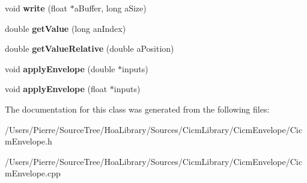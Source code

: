 \begin{DoxyCompactItemize}
\item 
\hypertarget{class_cicm_envelope_ad3eb165d5b296ecd2c532993c97a5d17}{void {\bfseries write} (float $\ast$a\-Buffer, long a\-Size)}\label{class_cicm_envelope_ad3eb165d5b296ecd2c532993c97a5d17}

\item 
\hypertarget{class_cicm_envelope_a35c269e2eba9d65b13dbcab6c62890a8}{double {\bfseries get\-Value} (long an\-Index)}\label{class_cicm_envelope_a35c269e2eba9d65b13dbcab6c62890a8}

\item 
\hypertarget{class_cicm_envelope_a0c9d3139c915d5b324c4d4a24e3931c7}{double {\bfseries get\-Value\-Relative} (double a\-Position)}\label{class_cicm_envelope_a0c9d3139c915d5b324c4d4a24e3931c7}

\item 
\hypertarget{class_cicm_envelope_a786d4ea6d6ecd1e8614a8eb1cba8ae68}{void {\bfseries apply\-Envelope} (double $\ast$inputs)}\label{class_cicm_envelope_a786d4ea6d6ecd1e8614a8eb1cba8ae68}

\item 
\hypertarget{class_cicm_envelope_aa080ff61cd42344591bb82de187b1a06}{void {\bfseries apply\-Envelope} (float $\ast$inputs)}\label{class_cicm_envelope_aa080ff61cd42344591bb82de187b1a06}

\end{DoxyCompactItemize}


The documentation for this class was generated from the following files\-:\begin{DoxyCompactItemize}
\item 
/\-Users/\-Pierre/\-Source\-Tree/\-Hoa\-Library/\-Sources/\-Cicm\-Library/\-Cicm\-Envelope/Cicm\-Envelope.\-h\item 
/\-Users/\-Pierre/\-Source\-Tree/\-Hoa\-Library/\-Sources/\-Cicm\-Library/\-Cicm\-Envelope/Cicm\-Envelope.\-cpp\end{DoxyCompactItemize}
